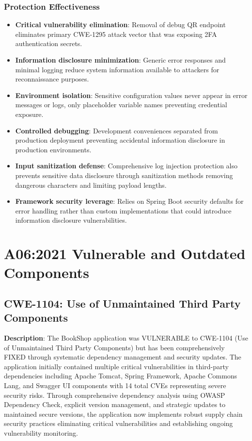 \documentclass[]{UCD_CS_FYP_Report}
\begin{document}
\subsection{Protection Effectiveness}
\begin{itemize}
	\item \textbf{Critical vulnerability elimination}: Removal of debug QR endpoint eliminates primary CWE-1295 attack vector that was exposing 2FA authentication secrets.
	\item \textbf{Information disclosure minimization}: Generic error responses and minimal logging reduce system information available to attackers for reconnaissance purposes.
	\item \textbf{Environment isolation}: Sensitive configuration values never appear in error messages or logs, only placeholder variable names preventing credential exposure.
	\item \textbf{Controlled debugging}: Development conveniences separated from production deployment preventing accidental information disclosure in production environments.
	\item \textbf{Input sanitization defense}: Comprehensive log injection protection also prevents sensitive data disclosure through sanitization methods removing dangerous characters and limiting payload lengths.
	\item \textbf{Framework security leverage}: Relies on Spring Boot security defaults for error handling rather than custom implementations that could introduce information disclosure vulnerabilities.
\end{itemize}



\chapter{A06:2021 Vulnerable and Outdated Components}

\section{CWE-1104: Use of Unmaintained Third Party Components}

\textbf{Description}: The BookShop application was VULNERABLE to CWE-1104 (Use of Unmaintained Third Party Components) but has been comprehensively FIXED through systematic dependency management and security updates. The application initially contained multiple critical vulnerabilities in third-party dependencies including Apache Tomcat, Spring Framework, Apache Commons Lang, and Swagger UI components with 14 total CVEs representing severe security risks. Through comprehensive dependency analysis using OWASP Dependency Check, explicit version management, and strategic updates to maintained secure versions, the application now implements robust supply chain security practices eliminating critical vulnerabilities and establishing ongoing vulnerability monitoring.
\end{document}
